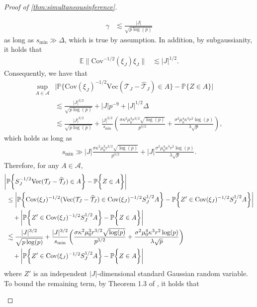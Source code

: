 \documentclass[10pt]{article}
\newcommand{\0}{{\mathbf{0}}}
\newcommand{\1}{{\mathbf{1}}}
\newcommand{\Cov}{{\rm Cov}}
\renewcommand{\citet}{\cite}
\newcommand{\p}{\mathbb{P}}
\renewcommand{\hat}{\widehat}
\renewcommand{\hat}{\widehat}
\begin{document}
\begin{proof}[Proof of \cref{thm:simultaneousinference}]
\begin{itemize}
\begin{align*}
    \gamma &\lesssim  \frac{|J|}{\sqrt{p\log(p)}}
\end{align*}
as long as $s_{\min} \gg \Delta$, which is true by assumption.  In addition, by subgaussianity, it holds that
\begin{align*}
    \mathbb{E} \| \mathrm{Cov}^{-1/2}( \xi_J) \xi_J \| &\lesssim | J |^{1/2}.
\end{align*}
Consequently, we have that
\begin{align*}
      \sup_{A \in \mathcal{A} } &\bigg| \p\bigg\{ \mathrm{Cov}(\xi_J)^{-1/2} \mathrm{Vec}(\mathcal{T}_J - \mathcal{\hat T}_J) \in A \bigg\} - \p\bigg\{ Z \in A \bigg\} \bigg| \\
      &\lesssim \frac{|J|^{3/2}}{\sqrt{p\log(p)}} + |J|p^{-9} + |J|^{1/2} \Delta \\
      &\lesssim \frac{|J|^{3/2}}{\sqrt{p \log(p)}} + \frac{ |J|^{3/2}}{s_{\min}} \left( \frac{\sigma \kappa^2 \mu_{0}^{3} r^{3 / 2} \sqrt{\log (p)}}{p^{3 / 2}}+ \frac{\sigma^{2} \mu_{0}^{4} \kappa^{3} r^{2} \log (p)}{\lambda \sqrt{p}}\right),
\end{align*}
which holds as long as
\begin{align}
    s_{\min} \gg |J| \frac{\sigma \kappa^2 \mu_{0}^{3} r^{3 / 2} \sqrt{\log (p)}}{p^{3 / 2}}+|J| \frac{\sigma^{2} \mu_{0}^{4} \kappa^{3} r^{2} \log (p)}{\lambda \sqrt{p}}. \label{smin2}
\end{align}
Therefore, for any $A \in \mathcal{A}$,
\begin{align*}
  \bigg| &\p\bigg\{ S_J^{-1/2} \mathrm{Vec}(\mathcal{T}_J - \mathcal{\hat T}_J) \in A \bigg\} - 
    \p \bigg\{ Z \in A \bigg\} \bigg| \\
    &\leq \bigg| \p\bigg\{ \mathrm{Cov}(\xi_J)^{-1/2}(\mathrm{Vec}(\mathcal{T}_J - \mathcal{\hat T}_J) \in \Cov(\xi_J)^{-1/2} S_J^{1/2} A \bigg\} - \p\bigg\{ Z' \in \Cov(\xi_J)^{-1/2} S_J^{1/2} A \bigg\} \bigg| \\
    &\quad + \bigg| \p\bigg\{ Z' \in \Cov(\xi_J)^{-1/2} S_J^{1/2} A \bigg\} - \p\bigg\{ Z \in A \bigg\} \bigg| \\
    &\lesssim \frac{|J|^{3/2}}{\sqrt{p\log(p)}} + \frac{ |J|^{3/2}}{s_{\min}}\bigg( \frac{\sigma \kappa^2 \mu_0^3 r^{3/2} \sqrt{\log(p)}}{p^{3/2}} + \frac{\sigma^2 \mu_0^4 \kappa^3 r^2 \log(p)}{\lambda \sqrt{p}} \bigg) \\
    &\quad + \bigg| \p\bigg\{ Z' \in \Cov(\xi_J)^{-1/2} S_J^{1/2} A \bigg\} - \p\bigg\{ Z \in A \bigg\} \bigg|
\end{align*}
where $Z'$ is an independent $|J|$-dimensional standard Gaussian random variable.  To bound the remaining term, by Theorem 1.3 of \citet{devroye_total_2022}, it holds that

\end{itemize}
\end{proof}
\end{document}
